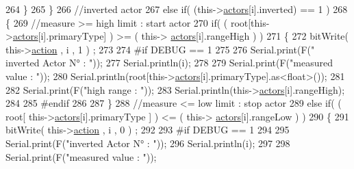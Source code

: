 \begin{DoxyCode}
264                         \}
265                     \}
266                     \textcolor{comment}{//inverted actor}
267                     \textcolor{keywordflow}{else} \textcolor{keywordflow}{if}( (this->\hyperlink{class_jetpack_a7e16d2f97837f9712a2e6de1c50d99db}{actors}[i].inverted) == 1 )
268                     \{
269                         \textcolor{comment}{//measure >= high limit : start actor}
270                         \textcolor{keywordflow}{if}( ( root[this->\hyperlink{class_jetpack_a7e16d2f97837f9712a2e6de1c50d99db}{actors}[i].primaryType] ) >= ( this->
      \hyperlink{class_jetpack_a7e16d2f97837f9712a2e6de1c50d99db}{actors}[i].rangeHigh ) )   
271                         \{   
272                             bitWrite( this->\hyperlink{class_jetpack_aca3142925a7b0834b34ae91d26af7765}{action} , i , 1 ) ;
273 
274 \textcolor{preprocessor}{                        #if DEBUG == 1}
275 
276                             Serial.print(F(\textcolor{stringliteral}{" inverted Actor N° : "}));
277                             Serial.println(i);
278                             
279                             Serial.print(F(\textcolor{stringliteral}{"measured value : "}));
280                             Serial.println(root[this->\hyperlink{class_jetpack_a7e16d2f97837f9712a2e6de1c50d99db}{actors}[i].primaryType].as<float>());
281 
282                             Serial.print(F(\textcolor{stringliteral}{"high range : "}));
283                             Serial.println(this->\hyperlink{class_jetpack_a7e16d2f97837f9712a2e6de1c50d99db}{actors}[i].rangeHigh);
284                         
285 \textcolor{preprocessor}{                        #endif}
286                             
287                         \}
288                         \textcolor{comment}{//measure <= low limit : stop actor}
289                         \textcolor{keywordflow}{else} \textcolor{keywordflow}{if}( ( root[ this->\hyperlink{class_jetpack_a7e16d2f97837f9712a2e6de1c50d99db}{actors}[i].primaryType ] ) <= ( this->
      \hyperlink{class_jetpack_a7e16d2f97837f9712a2e6de1c50d99db}{actors}[i].rangeLow ) )
290                         \{
291                             bitWrite( this->\hyperlink{class_jetpack_aca3142925a7b0834b34ae91d26af7765}{action} , i , 0 ) ;
292 
293 \textcolor{preprocessor}{                        #if DEBUG == 1}
294                             
295                             Serial.print(F(\textcolor{stringliteral}{"inverted Actor N° : "}));
296                             Serial.println(i);
297 
298                             Serial.print(F(\textcolor{stringliteral}{"measured value : "}));

\end{DoxyCode}
